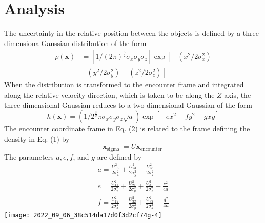 \documentclass[10pt]{article}
\begin{document}
\section{Analysis}
The uncertainty in the relative position between the objects is defined by a three-dimensionalGaussian distribution of the form
$$
\begin{aligned}
\rho(\boldsymbol{x}) &=\left[1 /(2 \pi)^{\frac{3}{2}} \sigma_{x} \sigma_{y} \sigma_{z}\right] \exp \left[-\left(x^{2} / 2 \sigma_{x}^{2}\right)\right.\\
&\left.-\left(y^{2} / 2 \sigma_{y}^{2}\right)-\left(z^{2} / 2 \sigma_{z}^{2}\right)\right]
\end{aligned}
$$
When the distribution is transformed to the encounter frame and integrated along the relative velocity direction, which is taken to be along the $Z$ axis, the three-dimensional Gaussian reduces to a two-dimensional Gaussian of the form
$$
h(\boldsymbol{x})=\left(1 / 2^{\frac{3}{2}} \pi \sigma_{x} \sigma_{y} \sigma_{z} \sqrt{a}\right) \exp \left[-e x^{2}-f y^{2}-g x y\right]
$$
The encounter coordinate frame in Eq. (2) is related to the frame defining the density in Eq. (1) by
$$
\boldsymbol{x}_{\text {sigma }}=U \boldsymbol{x}_{\text {encounter }}
$$
The parameters $a, e, f$, and $g$ are defined by
$$
\begin{gathered}
a=\frac{U_{13}^{2}}{2 \sigma_{x}^{2}}+\frac{U_{23}^{2}}{2 \sigma_{y}^{2}}+\frac{U_{33}^{2}}{2 \sigma_{z}^{2}} \\
e=\frac{U_{11}^{2}}{2 \sigma_{x}^{2}}+\frac{U_{21}^{2}}{2 \sigma_{y}^{2}}+\frac{U_{31}^{2}}{2 \sigma_{z}^{2}}-\frac{c^{2}}{4 a} \\
f=\frac{U_{12}^{2}}{2 \sigma_{x}^{2}}+\frac{U_{22}^{2}}{2 \sigma_{y}^{2}}+\frac{U_{32}^{2}}{2 \sigma_{z}^{2}}-\frac{d^{2}}{4 a}
\end{gathered}
$$
\texttt{[image: 2022\_09\_06\_38c514da17d0f3d2cf74g-4]}
\end{document}
